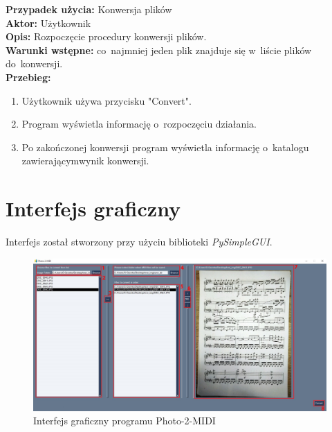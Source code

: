 \noindent \textbf{Przypadek użycia:} Konwersja plików\\
\textbf{Aktor:} Użytkownik\\
\textbf{Opis:} Rozpoczęcie procedury konwersji plików.\\
\textbf{Warunki wstępne:} co~najmniej jeden plik znajduje się w~liście plików do~konwersji.\\
\textbf{Przebieg:}
\begin{enumerate}
	\item Użytkownik używa przycisku "Convert".
	\item Program wyświetla informację o~rozpoczęciu działania.
	\item Po zakończonej konwersji program wyświetla informację o~katalogu zawierającym\linebreak wynik konwersji.
\end{enumerate}





\section{Interfejs graficzny}

Interfejs został stworzony przy użyciu biblioteki \textit{PySimpleGUI}.

\begin{figure}[htb]
	\centering
	\includegraphics[width=16cm]{images/gui}
	\caption{Interfejs graficzny programu Photo-2-MIDI}
	\label{fig:gui}
\end{figure}

